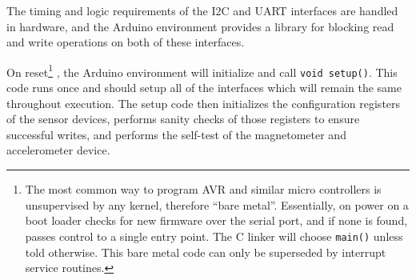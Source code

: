 \documentclass[12pt]{report}
\begin{document}
The timing and logic requirements of the I2C and UART interfaces are handled in hardware, and the Arduino environment provides a library for blocking read and write operations on both of these interfaces. 

On reset\footnote{The most common way to program AVR and similar micro controllers is unsupervised by any kernel, therefore ``bare metal''. Essentially, on power on a boot loader checks for new firmware over the serial port, and if none is found, passes control to a single entry point. The C linker will choose \lstinline$main()$ unless told otherwise. This bare metal code can only be superseded by interrupt service routines.}
, the Arduino environment will initialize and call \lstinline$void setup()$. This code runs once and should setup all of the interfaces which will remain the same throughout execution. The setup code then initializes the configuration registers of the sensor devices, performs sanity checks of those registers to ensure successful writes, and performs the self-test of the magnetometer and accelerometer device. 
\end{document}
